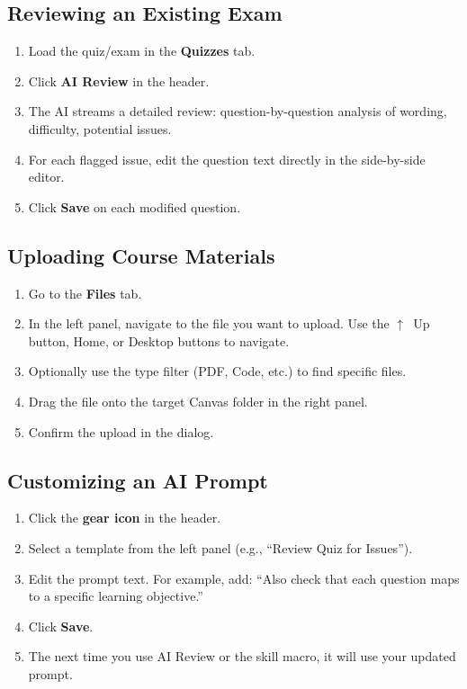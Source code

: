 \documentclass[12pt,letterpaper]{article}
\begin{document}
\subsection{Reviewing an Existing Exam}

\begin{enumerate}[leftmargin=*]
    \item Load the quiz/exam in the \textbf{Quizzes} tab.
    \item Click \textbf{AI Review} in the header.
    \item The AI streams a detailed review: question-by-question analysis of wording, difficulty, potential issues.
    \item For each flagged issue, edit the question text directly in the side-by-side editor.
    \item Click \textbf{Save} on each modified question.
\end{enumerate}

\subsection{Uploading Course Materials}

\begin{enumerate}[leftmargin=*]
    \item Go to the \textbf{Files} tab.
    \item In the left panel, navigate to the file you want to upload. Use the $\uparrow$~Up button, Home, or Desktop buttons to navigate.
    \item Optionally use the type filter (PDF, Code, etc.) to find specific files.
    \item Drag the file onto the target Canvas folder in the right panel.
    \item Confirm the upload in the dialog.
\end{enumerate}

\subsection{Customizing an AI Prompt}

\begin{enumerate}[leftmargin=*]
    \item Click the \textbf{gear icon} in the header.
    \item Select a template from the left panel (e.g., ``Review Quiz for Issues'').
    \item Edit the prompt text. For example, add: ``Also check that each question maps to a specific learning objective.''
    \item Click \textbf{Save}.
    \item The next time you use AI Review or the skill macro, it will use your updated prompt.
\end{enumerate}
\end{document}
